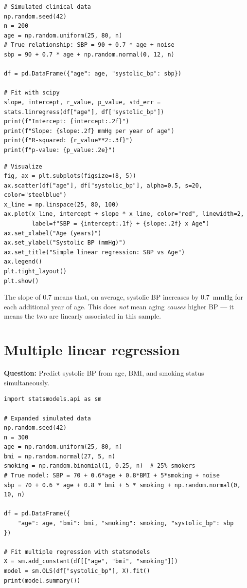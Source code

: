 \begin{verbatim}
# Simulated clinical data
np.random.seed(42)
n = 200
age = np.random.uniform(25, 80, n)
# True relationship: SBP = 90 + 0.7 * age + noise
sbp = 90 + 0.7 * age + np.random.normal(0, 12, n)

df = pd.DataFrame({"age": age, "systolic_bp": sbp})

# Fit with scipy
slope, intercept, r_value, p_value, std_err = stats.linregress(df["age"], df["systolic_bp"])
print(f"Intercept: {intercept:.2f}")
print(f"Slope: {slope:.2f} mmHg per year of age")
print(f"R-squared: {r_value**2:.3f}")
print(f"p-value: {p_value:.2e}")
\end{verbatim}

\begin{verbatim}
# Visualize
fig, ax = plt.subplots(figsize=(8, 5))
ax.scatter(df["age"], df["systolic_bp"], alpha=0.5, s=20, color="steelblue")
x_line = np.linspace(25, 80, 100)
ax.plot(x_line, intercept + slope * x_line, color="red", linewidth=2,
        label=f"SBP = {intercept:.1f} + {slope:.2f} x Age")
ax.set_xlabel("Age (years)")
ax.set_ylabel("Systolic BP (mmHg)")
ax.set_title("Simple linear regression: SBP vs Age")
ax.legend()
plt.tight_layout()
plt.show()
\end{verbatim}

\begin{clinicalnote}
The slope of 0.7 means that, on average, systolic BP increases by 0.7~mmHg for each additional year of age. This does \emph{not} mean aging \emph{causes} higher BP --- it means the two are linearly associated in this sample.
\end{clinicalnote}

\section{Multiple linear regression}

\textbf{Question:} Predict systolic BP from age, BMI, and smoking status simultaneously.

\begin{verbatim}
import statsmodels.api as sm

# Expanded simulated data
np.random.seed(42)
n = 300
age = np.random.uniform(25, 80, n)
bmi = np.random.normal(27, 5, n)
smoking = np.random.binomial(1, 0.25, n)  # 25% smokers
# True model: SBP = 70 + 0.6*age + 0.8*BMI + 5*smoking + noise
sbp = 70 + 0.6 * age + 0.8 * bmi + 5 * smoking + np.random.normal(0, 10, n)

df = pd.DataFrame({
    "age": age, "bmi": bmi, "smoking": smoking, "systolic_bp": sbp
})

# Fit multiple regression with statsmodels
X = sm.add_constant(df[["age", "bmi", "smoking"]])
model = sm.OLS(df["systolic_bp"], X).fit()
print(model.summary())
\end{verbatim}

